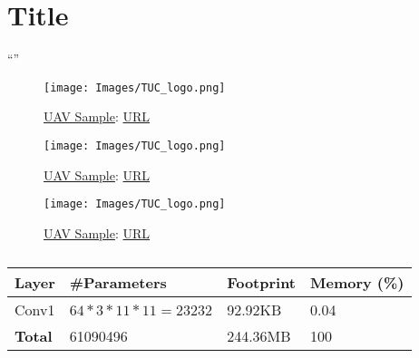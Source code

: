 \chapter{Title} %
\label{chap:ChapterX}  %
\epigraph{``” }{\textit{}}

% 
% 
\begin{figure} [H]
	\centering
	\texttt{[image: Images/TUC\_logo.png]}
	\decoRule
	\caption[UAV]{\hyperref[abbr:UAV Sample]{UAV Sample}: \href{google.com}{URL}}
	\label{fig:UAV-sample}
\end{figure}

% 
% 
\begin{figure} [H]
    \centering
    \begin{minipage}{.5\textwidth}
      \centering
      \texttt{[image: Images/TUC\_logo.png]}
      \decoRule
      \caption[UAV]{\hyperref[abbr:UAV Sample]{UAV Sample}: \href{google.com}{URL}}
      \label{fig:UAV-sample1}
    \end{minipage}%
    \begin{minipage}{.5\textwidth}
      \centering
      \texttt{[image: Images/TUC\_logo.png]}
      \decoRule
      \caption[UAV]{\hyperref[abbr:UAV Sample]{UAV Sample}: \href{google.com}{URL}}
      \label{fig:UAV-sample2}
    \end{minipage}
\end{figure}

% 
% 
\begin{table}[H]
    \caption{}
    \label{tab:}
    \centering
    \begin{tabular}{llll}
        \toprule
        \textbf{Layer} & \textbf{\#Parameters} & \textbf{Footprint} & \textbf{Memory (\%)}  \\
        \midrule
            Conv1 & $64 * 3 * 11 * 11 = 23232$ & 92.92KB & 0.04 \\
        \midrule
            \textbf{Total} & 61090496 & 244.36MB & 100 \\
        \bottomrule
    \end{tabular}
\end{table}